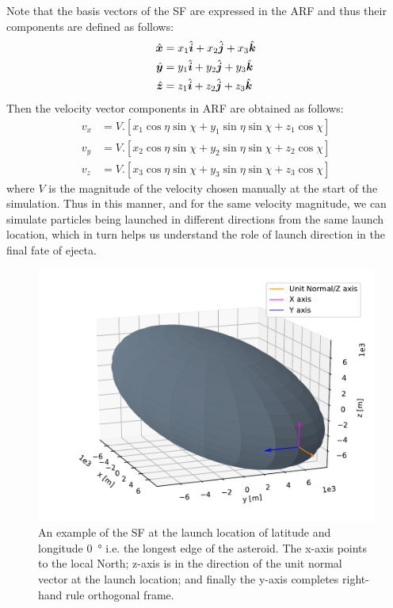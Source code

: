 %
\newline\newline
%
Note that the basis vectors of the \gls{SF} are expressed in the \gls{ARF} and thus their components are defined as follows:
\begin{align}
    \hat{\bm{x}} &= x_1\hat{\bm{i}} + x_2\hat{\bm{j}} + x_3\hat{\bm{k}}
    \label{eqn:sf_xbasis_exp} \\
    \hat{\bm{y}} &= y_1\hat{\bm{i}} + y_2\hat{\bm{j}} + y_3\hat{\bm{k}}
    \label{eqn:sf_ybasis_exp} \\
    \hat{\bm{z}} &= z_1\hat{\bm{i}} + z_2\hat{\bm{j}} + z_3\hat{\bm{k}}
    \label{eqn:sf_zbasis_exp}
\end{align}
Then the velocity vector components in \gls{ARF} are obtained as follows:
\begin{align}
    v_x &= V . \left[ x_1 \cos\eta \sin\chi + y_1 \sin\eta \sin\chi + z_1 \cos\chi \right]
    \label{eqn:xVelocity} \\
    v_y &= V . \left[ x_2 \cos\eta \sin\chi + y_2 \sin\eta \sin\chi + z_2 \cos\chi \right]
    \label{eqn:yVelocity} \\
    v_z &= V . \left[ x_3 \cos\eta \sin\chi + y_3 \sin\eta \sin\chi + z_3 \cos\chi \right]
    \label{eqn:zVelocity}
\end{align}
where $V$ is the magnitude of the velocity chosen manually at the start of the simulation. Thus in this manner, and for the same velocity magnitude, we can simulate particles being launched in different directions from the same launch location, which in turn helps us understand the role of launch direction in the final fate of ejecta.
\begin{figure}[htb]
\centering
\captionsetup{justification=centering}
\includegraphics[width=\textwidth, height=0.25\textheight, keepaspectratio=true]{surfaceFrame_longestEdge.pdf}
\caption{An example of the \gls{SF} at the launch location of latitude and longitude \SI{0}{\degree} i.e. the longest edge of the asteroid. The x-axis points to the local North; z-axis is in the direction of the unit normal vector at the launch location; and finally the y-axis completes right-hand rule orthogonal frame.}
\label{fig:surface_frame}
\end{figure}
